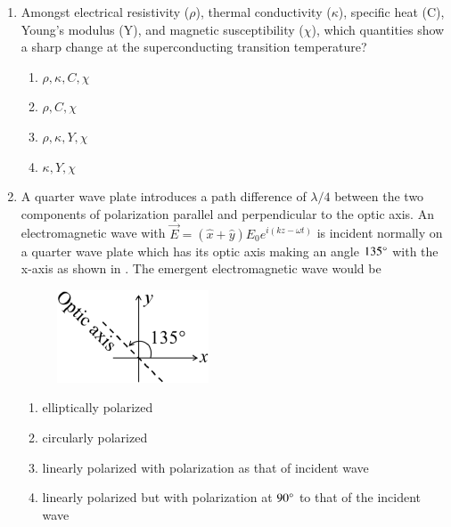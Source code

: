 \documentclass[journal,12pt,onecolumn]{IEEEtran}
\theoremstyle{remark}
\begin{document}
\begin{enumerate}
    \item Amongst electrical resistivity ($\rho$), thermal conductivity ($\kappa$), specific heat (C), Young's modulus (Y), and magnetic susceptibility ($\chi$), which quantities show a sharp change at the superconducting transition temperature?
    \hfill{} \begin{enumerate}
        \item $\rho, \kappa, C, \chi$
        \item $\rho, C, \chi$
        \item $\rho, \kappa, Y, \chi$
        \item $\kappa, Y, \chi$
    \end{enumerate}

    \item A quarter wave plate introduces a path difference of $\lambda/4$ between the two components of polarization parallel and perpendicular to the optic axis. An electromagnetic wave with $\vec{E} = (\hat{x} + \hat{y})E_0 e^{i(kz-\omega t)}$ is incident normally on a quarter wave plate which has its optic axis making an angle $135\degree$ with the x-axis as shown in . The emergent electromagnetic wave would be
    \begin{figure}[H]
        \centering
        \caption{} \label{fig:47} \includegraphics{figs/47.png}
    \end{figure}
    \hfill{} \begin{enumerate}
        \item elliptically polarized
        \item circularly polarized
        \item linearly polarized with polarization as that of incident wave
        \item linearly polarized but with polarization at $90\degree$ to that of the incident wave
    \end{enumerate}


\end{enumerate}
\end{document}
